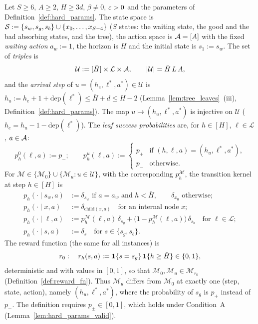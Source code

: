 \begin{definition}\label{def:hard_mdp}
\leanok
Let $S \ge 6$, $A \ge 2$, $H \ge 3d$, $\beta \ne 0$, $\varepsilon > 0$ and the parameters of
Definition~\ref{def:hard_params}. The state space is
$\mathcal{S} := \{s_w, s_g, s_b\} \cup \{x_0, \dots, x_{S-4}\}$ ($S$ states: the waiting state, the good
and the bad absorbing states, and the tree), the action space is $\mathcal{A} = [A]$ with the fixed
\emph{waiting action} $a_w := 1$, the horizon is $H$ and the initial state is $s_1 := s_w$. The set
of \emph{triples} is
\[
  \mathcal U := [\bar H] \times \mathcal L \times \mathcal{A}, \qquad \lvert \mathcal U \rvert = \bar H\, L\, A,
\]
and the \emph{arrival step} of $u = (h_e, \ell^*, a^*) \in \mathcal U$ is
$h_u := h_e + 1 + \mathrm{dep}(\ell^*) \le \bar H + d \le H - 2$ (Lemma~\ref{lem:tree_leaves}~(iii),
Definition~\ref{def:hard_params}). The map $u \mapsto (h_u, \ell^*, a^*)$ is injective on
$\mathcal U$ ($h_e = h_u - 1 - \mathrm{dep}(\ell^*)$). The \emph{leaf success probabilities} are,
for $h \in [H]$, $\ell \in \mathcal L$, $a \in \mathcal{A}$:
\[
  p^{0}_h(\ell, a) := p_- ; \qquad
  p^{u}_h(\ell, a) := \begin{cases} p_+ & \text{if } (h, \ell, a) = (h_u, \ell^*, a^*), \\ p_- & \text{otherwise.}\end{cases}
\]
For $\mathcal M \in \{\mathcal M_0\} \cup \{\mathcal M_u : u \in \mathcal U\}$, with the
corresponding $p^{\mathcal M}_h$, the transition kernel at step $h \in [H]$ is
\begin{align*}
  p_h(\cdot \mid s_w, a) &:= \delta_{s_w} \text{ if } a = a_w \text{ and } h < \bar H, \qquad \delta_{x_0} \text{ otherwise}; \\
  p_h(\cdot \mid x, a) &:= \delta_{\mathrm{child}(x, a)} \quad \text{for an internal node } x; \\
  p_h(\cdot \mid \ell, a) &:= p^{\mathcal M}_h(\ell,a)\,\delta_{s_g} + \big(1 - p^{\mathcal M}_h(\ell,a)\big)\,\delta_{s_b} \quad \text{for } \ell \in \mathcal L; \\
  p_h(\cdot \mid s, a) &:= \delta_s \quad \text{for } s \in \{s_g, s_b\} .
\end{align*}
The reward function (the same for all instances) is
\[
  r_0 : \quad r_h(s, a) := \mathbf{1}\{s = s_g\}\,\mathbf{1}\{h \ge \tilde H\} \in \{0, 1\},
\]
deterministic and with values in $[0,1]$, so that $\mathcal M_0, \mathcal M_u \in \mathcal M_{r_0}$
(Definition~\ref{def:reward_fn}). Thus $\mathcal M_u$ differs from $\mathcal M_0$ at exactly one
(step, state, action), namely $(h_u, \ell^*, a^*)$, where the probability of $s_g$ is $p_+$
instead of $p_-$. The definition requires $p_\pm \in [0,1]$, which holds under Condition~A
(Lemma~\ref{lem:hard_params_valid}).
\end{definition}

